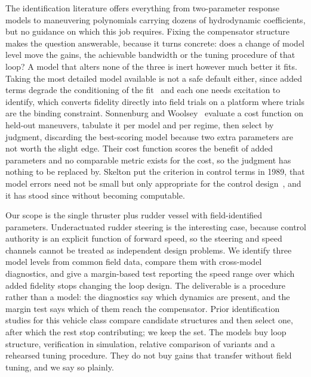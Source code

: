 \documentclass[conference]{IEEEtran}
\begin{document}
The identification literature offers everything from two-parameter response models to maneuvering polynomials carrying dozens of hydrodynamic coefficients, but no guidance on which this job requires. Fixing the compensator structure makes the question answerable, because it turns concrete: does a change of model level move the gains, the achievable bandwidth or the tuning procedure of that loop? A model that alters none of the three is inert however much better it fits. Taking the most detailed model available is not a safe default either, since added terms degrade the conditioning of the fit~\cite{alexandersson2022system,suarez2026regularized} and each one needs excitation to identify, which converts fidelity directly into field trials on a platform where trials are the binding constraint. Sonnenburg and Woolsey~\cite{sonnenburg2013modeling} evaluate a cost function on held-out maneuvers, tabulate it per model and per regime, then select by judgment, discarding the best-scoring model because two extra parameters are not worth the slight edge. Their cost function scores the benefit of added parameters and no comparable metric exists for the cost, so the judgment has nothing to be replaced by. Skelton put the criterion in control terms in 1989, that model errors need not be small but only appropriate for the control design~\cite{skelton1989model}, and it has stood since without becoming computable.

Our scope is the single thruster plus rudder vessel with field-identified parameters. Underactuated rudder steering is the interesting case, because control authority is an explicit function of forward speed, so the steering and speed channels cannot be treated as independent design problems. We identify three model levels from common field data, compare them with cross-model diagnostics, and give a margin-based test reporting the speed range over which added fidelity stops changing the loop design. The deliverable is a procedure rather than a model: the diagnostics say which dynamics are present, and the margin test says which of them reach the compensator. Prior identification studies for this vehicle class compare candidate structures and then select one, after which the rest stop contributing; we keep the set. The models buy loop structure, verification in simulation, relative comparison of variants and a rehearsed tuning procedure. They do not buy gains that transfer without field tuning, and we say so plainly.

\end{document}
